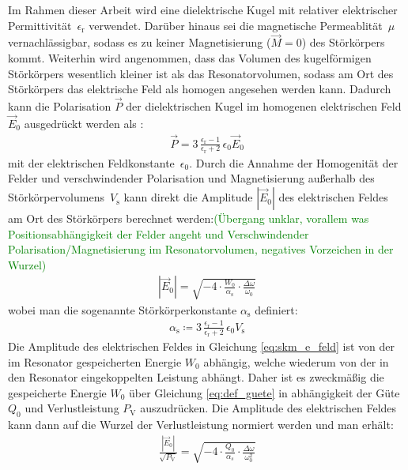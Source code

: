 \documentclass[11pt, a4paper]{scrbook}
\newcommand{\ve}{\vec{E}}
\newcommand{\todo}[1]{{\textcolor{Green}{(#1)}}}
\begin{document}
	Im Rahmen dieser Arbeit wird eine dielektrische Kugel mit relativer elektrischer Permittivität~$\epsilon_\mathrm{r}$ verwendet.
	Darüber hinaus sei die magnetische Permeablität~$\mu$ vernachlässigbar, sodass es zu keiner Magnetisierung ($\vec{M} = 0$) des Störkörpers kommt.
	Weiterhin wird angenommen, dass das Volumen des kugelförmigen Störkörpers wesentlich kleiner ist als das Resonatorvolumen, sodass am Ort des Störkörpers das elektrische Feld als homogen angesehen werden kann.
	Dadurch kann die Polarisation $\vec{P}$ der dielektrischen Kugel im homogenen elektrischen Feld $\ve_0$ ausgedrückt werden als \cite{jackson}:
	\begin{align}
		\vec{P} = 3 \, \frac{\epsilon_\mathrm{r} - 1}{\epsilon_\mathrm{r} + 2} \, \epsilon_0 \ve_0
		\label{eq:polarisation_kugel}
	\end{align}
	mit der elektrischen Feldkonstante~$\epsilon_0$.
	Durch die Annahme der Homogenität der Felder und verschwindender Polarisation und Magnetisierung außerhalb des Störkörpervolumens~$V_\mathrm{s}$ kann direkt die Amplitude $|\ve_0|$ des elektrischen Feldes am Ort des Störkörpers berechnet werden:\todo{Übergang unklar, vorallem was Positionsabhängigkeit der Felder angeht und Verschwindender Polarisation/Magnetisierung im Resonatorvolumen, negatives Vorzeichen in der Wurzel}
	\begin{align}
		|\ve_0| = \sqrt{-4 \cdot \frac{W_0}{\alpha_\mathrm{s}} \cdot \frac{\Delta \omega}{\omega_0}} \label{eq:skm_e_feld}
	\end{align}
	wobei man die sogenannte Störkörperkonstante $\alpha_\mathrm{s}$ definiert:
	\begin{align}
		\alpha_\mathrm{s} \coloneqq 3 \, \frac{\epsilon_\mathrm{r} - 1}{\epsilon_\mathrm{r} + 2} \, \epsilon_0 V_\mathrm{s}
	\end{align}
	Die Amplitude des elektrischen Feldes in Gleichung \eqref{eq:skm_e_feld} ist von der im Resonator gespeicherten Energie $W_0$ abhängig, welche wiederum von der in den Resonator eingekoppelten Leistung abhängt.
	Daher ist es zweckmäßig die gespeicherte Energie $W_0$ über Gleichung \eqref{eq:def_guete} in abhängigkeit der Güte $Q_0$ und Verlustleistung $P_\mathrm{V}$ auszudrücken.
	Die Amplitude des elektrischen Feldes kann dann auf die Wurzel der Verlustleistung normiert werden und man erhält:
	\begin{align}
		\frac{|\ve_0|}{\sqrt{P_\mathrm{V}}} = \sqrt{-4 \cdot \frac{Q_0}{\alpha_s} \cdot \frac{\Delta \omega}{\omega_0^2}}
	\end{align}	
	
\end{document}
